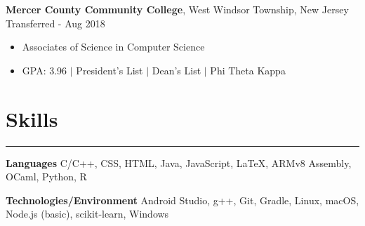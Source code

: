\documentclass[10pt]{article}
\newcommand{\resumesection}[1]{\vspace{-0.2cm}\section*{#1}\vspace{-0.2cm}\hrule\vspace{0.2cm}}
\begin{document}
\textbf{Mercer County Community College}, West Windsor Township, New Jersey \hfill Transferred - Aug 2018
\begin{itemize}
	\item[] Associates of Science in Computer Science
	\item[] GPA: 3.96 $\vert$ President's List $\vert$ Dean's List $\vert$ Phi Theta Kappa
\end{itemize}


\resumesection{Skills}
\textbf{Languages} C/C++, CSS, HTML, Java, JavaScript, \LaTeX, ARMv8 Assembly, OCaml, Python, R


\textbf{Technologies/Environment} Android Studio, g++, Git, Gradle, Linux, macOS, Node.js (basic), scikit-learn, Windows


%


\end{document}
